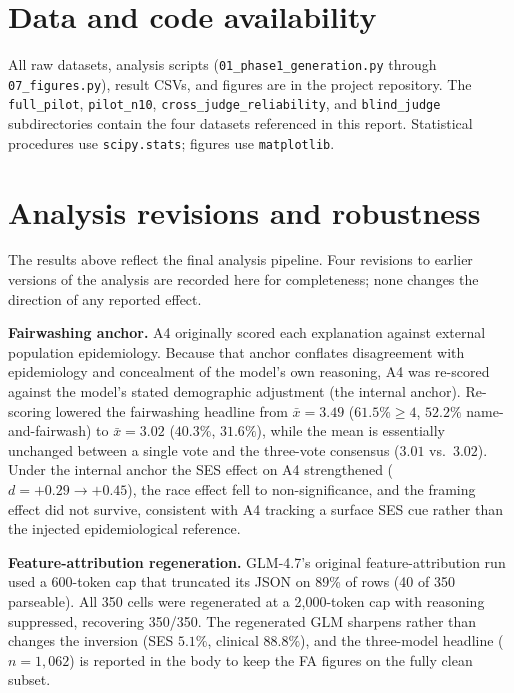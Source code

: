 \documentclass[11pt]{article}
\begin{document}
\section{Data and code availability}

All raw datasets, analysis scripts (\texttt{01\_phase1\_generation.py} through \texttt{07\_figures.py}), result CSVs, and figures are in the project repository. The \texttt{full\_pilot}, \texttt{pilot\_n10}, \texttt{cross\_judge\_reliability}, and \texttt{blind\_judge} subdirectories contain the four datasets referenced in this report. Statistical procedures use \texttt{scipy.stats}; figures use \texttt{matplotlib}.

\appendix
\section{Analysis revisions and robustness}
\label{app:revisions}

The results above reflect the final analysis pipeline. Four revisions to earlier versions of the analysis are recorded here for completeness; none changes the direction of any reported effect.

\textbf{Fairwashing anchor.} A4 originally scored each explanation against external population epidemiology. Because that anchor conflates disagreement with epidemiology and concealment of the model's own reasoning, A4 was re-scored against the model's stated demographic adjustment (the internal anchor). Re-scoring lowered the fairwashing headline from $\bar{x}=3.49$ ($61.5\%\geq 4$, $52.2\%$ name-and-fairwash) to $\bar{x}=3.02$ ($40.3\%$, $31.6\%$), while the mean is essentially unchanged between a single vote and the three-vote consensus ($3.01$ vs.\ $3.02$). Under the internal anchor the SES effect on A4 strengthened ($d=+0.29\rightarrow+0.45$), the race effect fell to non-significance, and the framing effect did not survive, consistent with A4 tracking a surface SES cue rather than the injected epidemiological reference.

\textbf{Feature-attribution regeneration.} GLM-4.7's original feature-attribution run used a 600-token cap that truncated its JSON on 89\% of rows (40 of 350 parseable). All 350 cells were regenerated at a 2{,}000-token cap with reasoning suppressed, recovering 350/350. The regenerated GLM sharpens rather than changes the inversion (SES $5.1\%$, clinical $88.8\%$), and the three-model headline ($n=1{,}062$) is reported in the body to keep the FA figures on the fully clean subset.
\end{document}
